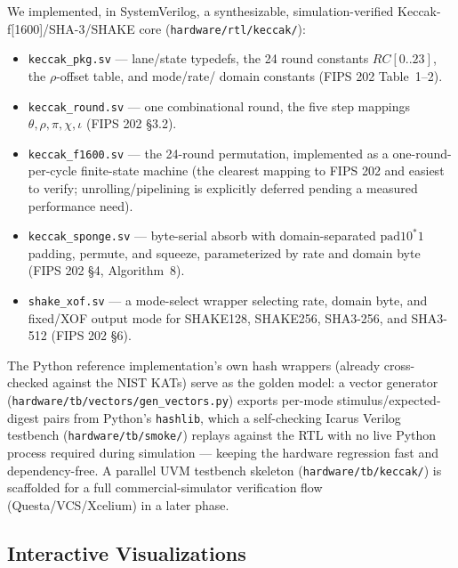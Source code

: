 \documentclass[10pt,conference]{IEEEtran}
\begin{document}
We implemented, in SystemVerilog, a synthesizable, simulation-verified
Keccak-f[1600]/SHA-3/SHAKE core (\texttt{hardware/rtl/keccak/}):

\begin{itemize}
\item \texttt{keccak\_pkg.sv} --- lane/state typedefs, the 24
  round constants $RC[0..23]$, the $\rho$-offset table, and mode/rate/
  domain constants (FIPS 202 Table~1--2).
\item \texttt{keccak\_round.sv} --- one combinational round, the five
  step mappings $\theta, \rho, \pi, \chi, \iota$ (FIPS 202 \S3.2).
\item \texttt{keccak\_f1600.sv} --- the 24-round permutation, implemented
  as a one-round-per-cycle finite-state machine (the clearest mapping to
  FIPS 202 and easiest to verify; unrolling/pipelining is explicitly
  deferred pending a measured performance need).
\item \texttt{keccak\_sponge.sv} --- byte-serial absorb with
  domain-separated $\mathrm{pad10^{*}1}$ padding, permute, and squeeze,
  parameterized by rate and domain byte (FIPS 202 \S4, Algorithm~8).
\item \texttt{shake\_xof.sv} --- a mode-select wrapper selecting rate,
  domain byte, and fixed/XOF output mode for SHAKE128, SHAKE256,
  SHA3-256, and SHA3-512 (FIPS 202 \S6).
\end{itemize}

The Python reference implementation's own hash wrappers (already
cross-checked against the NIST KATs) serve as the golden model: a vector
generator (\texttt{hardware/tb/vectors/gen\_vectors.py}) exports
per-mode stimulus/expected-digest pairs from Python's \texttt{hashlib},
which a self-checking Icarus Verilog testbench
(\texttt{hardware/tb/smoke/}) replays against the RTL with no live
Python process required during simulation --- keeping the hardware
regression fast and dependency-free. A parallel UVM testbench skeleton
(\texttt{hardware/tb/keccak/}) is scaffolded for a full commercial-simulator
verification flow (Questa/VCS/Xcelium) in a later phase.

\subsection{Interactive Visualizations}
\end{document}
